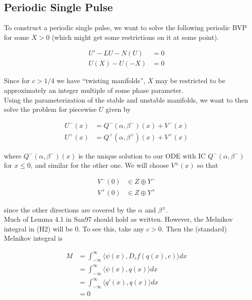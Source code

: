 \documentclass[12pt]{article}
\begin{document}
\subsection*{Periodic Single Pulse}

To construct a periodic single pulse, we want to solve the following periodic BVP for some $X > 0$ (which might get some restrictions on it at some point).

\begin{align*}
U' - LU - N(U) &= 0 \\
U(X) - U(-X) &= 0 
\end{align*}

Since for $c > 1/4$ we have ``twisting manifolds'', $X$ may be restricted to be approximately an integer multiple of some phase parameter.\\

Using the parameterization of the stable and unstable manifolds, we want to then solve the problem for piecewise $U$ given by

\begin{align*}
U^-(x) &= Q^-(\alpha, \beta^-)(x) + V^-(x) \\
U^+(x) &= Q^+(\alpha, \beta^+)(x) + V^+(x)
\end{align*}

where $Q^-(\alpha, \beta^-)(x)$ is the unique solution to our ODE with IC $Q^-(\alpha, \beta^-)$ for $x \leq 0$, and similar for the other one. We will choose $V^\pm(x)$ so that

\begin{align*}
V^-(0) &\in Z \oplus Y^- \\
V^+(0) &\in Z \oplus Y^+
\end{align*}

since the other directions are covered by the $\alpha$ and $\beta^\pm$.\\

Much of Lemma 4.1 in San97 should hold as written. However, the Melnikov integral in (H2) will be 0. To see this, take any $c > 0$. Then the (standard) Melnikov integral is

\begin{align*}
M &= \int_{-\infty}^\infty \langle \psi(x), D_c f(q(x), c) \rangle dx \\
&= \int_{-\infty}^\infty \langle \psi(x), q(x) \rangle dx \\
&= \int_{-\infty}^\infty \langle q'(x), q(x) \rangle dx \\
&= 0
\end{align*}
\end{document}
